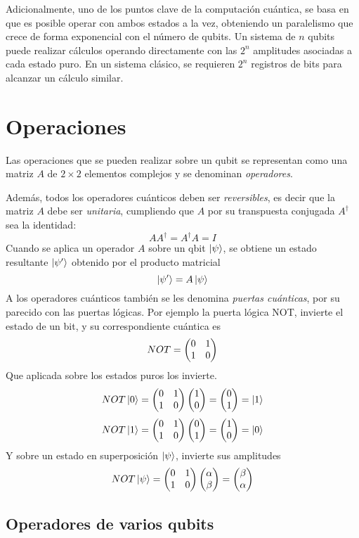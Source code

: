 Adicionalmente, uno de los puntos clave de la computación cuántica, se basa en 
que es posible operar con ambos estados a la vez, obteniendo un paralelismo que 
crece de forma exponencial con el número de qubits. Un sistema de $n$ qubits 
puede realizar cálculos operando directamente con las $2^n$ amplitudes asociadas 
a cada estado puro. En un sistema clásico, se requieren $2^n$ registros de bits 
para alcanzar un cálculo similar.

\section{Operaciones}

Las operaciones que se pueden realizar sobre un qubit se representan como una 
matriz $A$ de $2 \times 2$ elementos complejos y se denominan 
\textit{operadores}.

Además, todos los operadores cuánticos deben ser \textit{reversibles}, es decir 
que la matriz $A$ debe ser \textit{unitaria}, cumpliendo que $A$ por su 
transpuesta conjugada $A^\dagger$ sea la identidad:
$$ A A^\dagger = A^\dagger A = I$$
%
Cuando se aplica un operador $A$ sobre un qbit $\ket{\psi}$, se obtiene un 
estado resultante $\ket{\psi'}$ obtenido por el producto matricial
$$ \ket{\psi'} = A\ket{\psi} $$
%
A los operadores cuánticos también se les denomina \textit{puertas cuánticas}, 
por su parecido con las puertas lógicas. Por ejemplo la puerta lógica NOT, 
invierte el estado de un bit, y su correspondiente cuántica es
%
$$ NOT = \begin{pmatrix} 0 & 1\\1 & 0 \end{pmatrix} $$
%
Que aplicada sobre los estados puros los invierte.
%
$$ NOT\ket{0} = \begin{pmatrix} 0 & 1\\1 & 0 \end{pmatrix} \begin{pmatrix} 1\\0 \end{pmatrix} = \begin{pmatrix} 0\\1 \end{pmatrix} = \ket{1} $$
$$ NOT\ket{1} = \begin{pmatrix} 0 & 1\\1 & 0 \end{pmatrix} \begin{pmatrix} 0\\1 \end{pmatrix} = \begin{pmatrix} 1\\0 \end{pmatrix} = \ket{0} $$
%
Y sobre un estado en superposición $\ket{\psi}$, invierte sus amplitudes
%
$$ NOT\ket{\psi} = \begin{pmatrix} 0 & 1\\1 & 0 \end{pmatrix} \begin{pmatrix} \alpha \\ \beta \end{pmatrix} =
\begin{pmatrix} \beta\\\alpha \end{pmatrix} $$
%

\subsection{Operadores de varios qubits}


